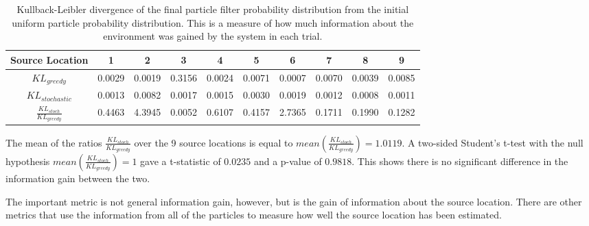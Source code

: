 \documentclass[submit, 12pt]{aiaa-pretty-modified}
\begin{document}
\begin{table}[htb]
\begin{center}
\begin{tabular}{|c||c||c||c||c||c||c||c||c||c|}
\hline
 Source Location & 1 & 2 & 3 & 4 & 5 & 6 & 7 & 8 & 9 \\
\hline \hline
$KL_{greedy}$  & 0.0029 & 0.0019 & 0.3156 & 0.0024 & 0.0071 & 0.0007 & 0.0070 & 0.0039 & 0.0085 \\
\hline
$KL_{stochastic}$ & 0.0013 & 0.0082 & 0.0017 & 0.0015 & 0.0030 & 0.0019 & 0.0012 & 0.0008 & 0.0011 \\
\hline
$\frac{KL_{stoch}}{KL_{greedy}}$ & 0.4463 & 4.3945 & 0.0052 & 0.6107 & 0.4157 & 2.7365 & 0.1711 & 0.1990 & 0.1282 \\
\hline
\end{tabular}
\caption[KL divergence of posterior distribution from a uniform distribution]{Kullback-Leibler divergence of the final particle filter
  probability distribution from the initial uniform particle
  probability distribution.  This is a measure of how much
  information about the environment was gained by the system in each trial. }
\label{tab:allinfo}
\end{center}
\end{table}

The mean of the ratios $\frac{KL_{stoch}}{KL_{greedy}}$ over the 9
source locations is equal to $mean(\frac{KL_{stoch}}{KL_{greedy}}) =
1.0119$.  A two-sided Student's t-test with the null hypothesis
$mean(\frac{KL_{stoch}}{KL_{greedy}}) = 1$ gave a t-statistic of
$0.0235$ and a p-value of $0.9818$.  This shows there is no significant
difference in the information gain between the two.

The important metric is not general information gain, however, but is the gain
of information about the source location. There are other metrics that use the
information from all of the particles to measure how well the source location
has been estimated. 
\end{document}
